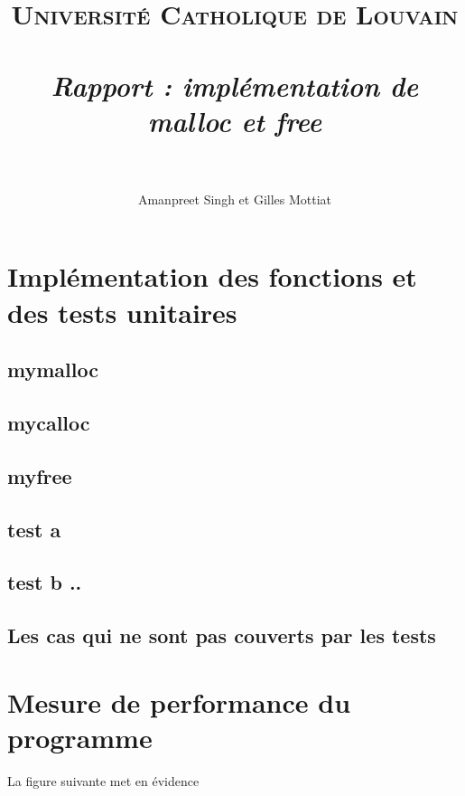 \documentclass[11pt]{report}
\title{
        \usefont{OT1}{bch}{b}{n}
        \normalfont \normalsize \textsc{Université Catholique de Louvain } \\ [25pt]
        \horrule{0.5pt} \\[0.4cm]
        \huge \emph{Rapport : implémentation de malloc et free} \\
        \horrule{2pt} \\[0.5cm]
}
\author{
        \normalfont                                 \normalsize
            \normalsize
            Amanpreet Singh et Gilles Mottiat\\
}
\begin{document}
\maketitle
\newpage

\tableofcontents

\chapter{Implémentation des fonctions et des tests unitaires}
\section{mymalloc}
\section{mycalloc}
\section{myfree}
\section{test a}
\section{test b ..}
\section{Les cas qui ne sont pas couverts par les tests}

\chapter{Mesure de performance du programme}
La figure suivante met en évidence 
\end{document}
